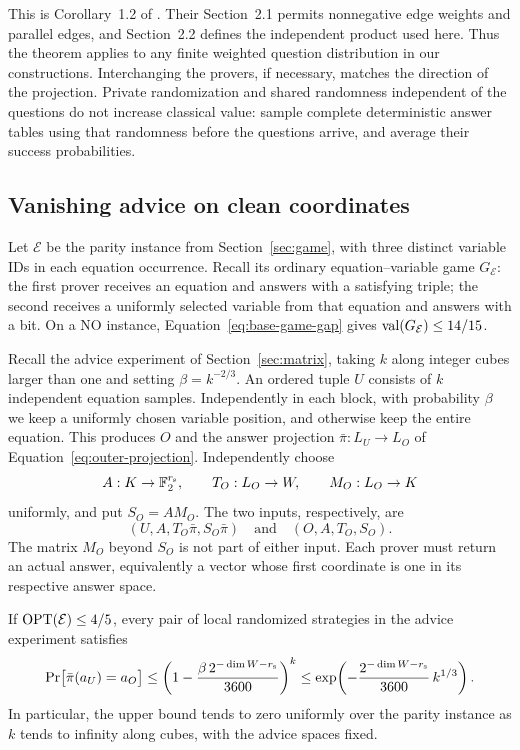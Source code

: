 This is Corollary~1.2 of \cite{DS14}.  Their Section~2.1 permits
nonnegative edge weights and
parallel edges, and Section~2.2 defines the independent product used
here.  Thus the theorem applies to any finite weighted question
distribution in our constructions.  Interchanging the provers, if
necessary, matches the direction of the projection.  Private
randomization and shared randomness independent of the questions do not
increase classical value: sample complete deterministic answer tables
using that randomness before the questions arrive, and average their
success probabilities.

\subsection{Vanishing advice on clean coordinates}

Let $\mathcal E$ be the parity instance from Section~\ref{sec:game},
with three distinct variable IDs in each equation occurrence.  Recall
its ordinary equation--variable game $G_{\mathcal E}$: the first
prover receives an equation and answers with a satisfying triple;
the second receives a uniformly selected variable from that equation
and answers with a bit.  On a NO instance,
Equation~\eqref{eq:base-game-gap} gives
$\operatorname{val}(G_{\mathcal E})\le14/15$.

Recall the advice experiment of Section~\ref{sec:matrix}, taking $k$
along integer cubes larger than one and setting $\beta=k^{-2/3}$.
An ordered tuple $U$ consists of $k$ independent equation samples.
Independently in each block, with probability $\beta$ we keep a uniformly
chosen variable position, and otherwise keep the entire equation.
This produces $O$ and the answer projection $\bar\pi:L_U\to L_O$
of Equation~\eqref{eq:outer-projection}.  Independently choose
\[
 A:K\to\mathbb F_2^{r_{\rm s}},\qquad
 T_O:L_O\to W,\qquad M_O:L_O\to K
\]
uniformly, and put $S_O=AM_O$.  The two inputs, respectively, are
\begin{equation}
 (U,A,T_O\bar\pi,S_O\bar\pi)
 \quad\text{and}\quad
 (O,A,T_O,S_O).
 \label{eq:clean-advice-inputs}
\end{equation}
The matrix $M_O$ beyond $S_O$ is not part of either input.  Each prover
must return an actual answer, equivalently a vector whose first
coordinate is one in its respective answer space.

\begin{lemma}
\label{lem:clean}
If $\operatorname{OPT}(\mathcal E)\le 4/5$, every pair of local randomized strategies
in the advice experiment satisfies
\begin{equation}
 \Pr\bigl[\bar\pi(a_U)=a_O\bigr]
 \le \left(1-\frac{\beta\,2^{-\dim W-r_{\rm s}}}{3600}\right)^k
 \le
 \exp\!\left(
 -\frac{2^{-\dim W-r_{\rm s}}}{3600}\,k^{1/3}
 \right).
 \label{eq:clean-agreement-bound}
\end{equation}
In particular, the upper bound tends to zero uniformly over the parity
instance as $k$ tends to infinity along cubes, with the advice spaces
fixed.
\end{lemma}


